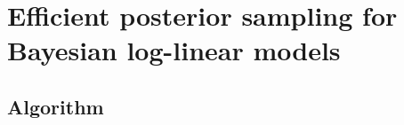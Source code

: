 \chapter{Efficient posterior sampling for Bayesian log-linear models}

\fancyhead[RO,LE]{\thepage}

\setlength{\parskip}{0.5pt}

\bigskip

\section{Algorithm} 
\noindent

